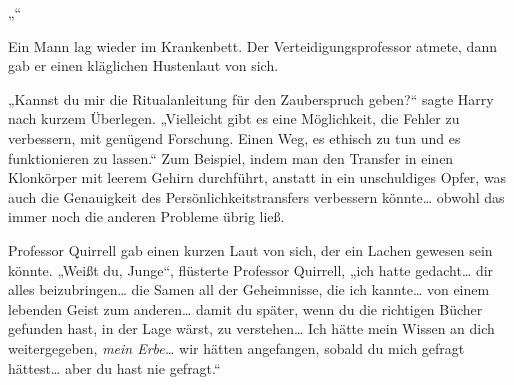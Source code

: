 „“

Ein Mann lag wieder im Krankenbett. Der Verteidigungsprofessor atmete, dann gab er einen kläglichen Hustenlaut von sich.

„Kannst du mir die Ritualanleitung für den Zauberspruch geben?“ sagte Harry nach kurzem Überlegen. „Vielleicht gibt es eine Möglichkeit, die Fehler zu verbessern, mit genügend Forschung. Einen Weg, es ethisch zu tun und es funktionieren zu lassen.“
Zum Beispiel, indem man den Transfer in einen Klonkörper mit leerem Gehirn durchführt, anstatt in ein unschuldiges Opfer, was auch die Genauigkeit des Persönlichkeitstransfers verbessern könnte… obwohl das immer noch die anderen Probleme übrig ließ.

Professor Quirrell gab einen kurzen Laut von sich, der ein Lachen gewesen sein könnte. „Weißt du, Junge“, flüsterte Professor Quirrell, „ich hatte gedacht… dir alles beizubringen… die Samen all der Geheimnisse, die ich kannte… von einem lebenden Geist zum anderen… damit du später, wenn du die richtigen Bücher gefunden hast, in der Lage wärst, zu verstehen… Ich hätte mein Wissen an dich weitergegeben, \emph{mein Erbe…} wir hätten angefangen, sobald du mich gefragt hättest… aber du hast nie gefragt.“

